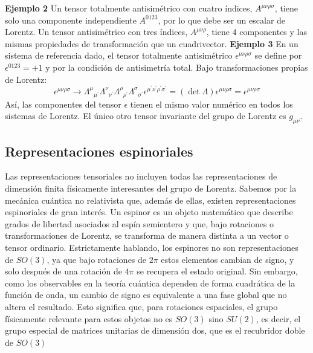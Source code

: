 \documentclass[a4paper,11pt]{book} %
\begin{document}
\medskip\newline
\textbf{Ejemplo 2} 
\medskip\newline\noindent
Un tensor totalmente antisimétrico con cuatro índices, $A^{\mu\nu\rho\sigma}$, tiene solo una componente independiente $A^{0123}$, por lo que debe ser un escalar de Lorentz. 
\medskip\newline
Un tensor antisimétrico con tres índices, $A^{\mu\nu\rho}$, tiene 4 componentes y las mismas propiedades de transformación que un cuadrivector.
\medskip\newline
\textbf{Ejemplo 3} 
\medskip\newline\noindent
En un sistema de referencia dado, el tensor totalmente antisimétrico $\epsilon^{\mu\nu\rho\sigma}$ se define por $\epsilon^{0123}=+1$ y por la condición de antisimetría total. Bajo transformaciones propias de Lorentz:
\begin{equation}
\epsilon^{\mu\nu\rho\sigma}\rightarrow{\Lambda^{\mu}}_{\mu^{\prime}}{\Lambda^{\nu}}_{\nu^{\prime}}{\Lambda^{\rho}}_{\rho^{\prime}}{\Lambda^{\sigma}}_{\sigma^{\prime}}\epsilon^{\mu^{\prime}\nu^{\prime}\rho^{\prime}\sigma^{\prime}}=(\det\Lambda)\epsilon^{\mu\nu\rho\sigma}=\epsilon^{\mu\nu\rho\sigma}
\end{equation}
Así, las componentes del tensor $\epsilon$ tienen el mismo valor numérico en todos los sistemas de Lorentz. El único otro tensor invariante del grupo de Lorentz es $g_{\mu\nu}$.
\subsection{Representaciones espinoriales}
\noindent
Las representaciones tensoriales no incluyen todas las representaciones de dimensión finita físicamente interesantes del grupo de Lorentz. Sabemos por la mecánica cuántica no relativista que, además de ellas, existen representaciones espinoriales de gran interés. Un espinor es un objeto matemático que describe grados de libertad asociados al espín semientero y que, bajo rotaciones o transformaciones de Lorentz, se transforma de manera distinta a un vector o tensor ordinario.
\medskip\newline
Estrictamente hablando, los espinores no son representaciones de $SO(3)$, ya que bajo rotaciones de $2\pi$ estos elementos cambian de signo, y solo después de una rotación de $4\pi$ se recupera el estado original. 
\medskip\newline
Sin embargo, como los observables en la teoría cuántica dependen de forma cuadrática de la función de onda, un cambio de signo es equivalente a una fase global que no altera el resultado. Esto significa que, para rotaciones espaciales, el grupo físicamente relevante para estos objetos no es $SO(3)$ sino $SU(2)$, es decir, el grupo especial de matrices unitarias de dimensión dos, que es el recubridor doble de $SO(3)$
\end{document}
